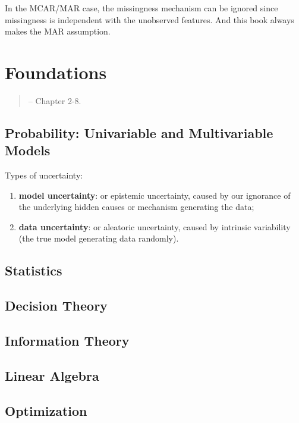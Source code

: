 \begin{note}
    In the MCAR/MAR case, the missingness mechanism can be ignored since missingness is
    independent with the unobserved features. 
    And this book always makes the MAR assumption.
\end{note}

\section{Foundations}
\begin{quote}
    \citep{pml1Book} -- Chapter 2-8.
\end{quote}

\subsection{Probability: Univariable and Multivariable Models}

Types of uncertainty:
\begin{enumerate}
    \item \textbf{model uncertainty}: or epistemic uncertainty,
    caused by our ignorance of the underlying hidden causes or mechanism generating the data;
    \item \textbf{data uncertainty}: or aleatoric uncertainty,
    caused by intrinsic variability (the true model generating data randomly).
\end{enumerate}


\subsection{Statistics}

\subsection{Decision Theory}

\subsection{Information Theory}

\subsection{Linear Algebra}

\subsection{Optimization}
